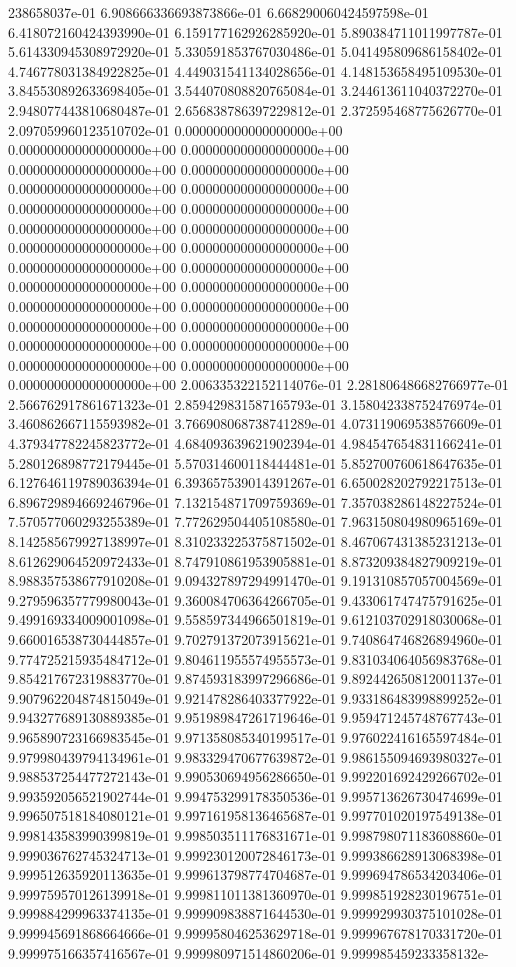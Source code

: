 238658037e-01	6.908666336693873866e-01	6.668290060424597598e-01	6.418072160424393990e-01	6.159177162926285920e-01	5.890384711011997787e-01	5.614330945308972920e-01	5.330591853767030486e-01	5.041495809686158402e-01	4.746778031384922825e-01	4.449031541134028656e-01	4.148153658495109530e-01	3.845530892633698405e-01	3.544070808820765084e-01	3.244613611040372270e-01	2.948077443810680487e-01	2.656838786397229812e-01	2.372595468775626770e-01	2.097059960123510702e-01	0.000000000000000000e+00	0.000000000000000000e+00	0.000000000000000000e+00	0.000000000000000000e+00	0.000000000000000000e+00	0.000000000000000000e+00	0.000000000000000000e+00	0.000000000000000000e+00	0.000000000000000000e+00	0.000000000000000000e+00	0.000000000000000000e+00	0.000000000000000000e+00	0.000000000000000000e+00	0.000000000000000000e+00	0.000000000000000000e+00	0.000000000000000000e+00	0.000000000000000000e+00	0.000000000000000000e+00	0.000000000000000000e+00	0.000000000000000000e+00	0.000000000000000000e+00	0.000000000000000000e+00	0.000000000000000000e+00	0.000000000000000000e+00	0.000000000000000000e+00	0.000000000000000000e+00	2.006335322152114076e-01	2.281806486682766977e-01	2.566762917861671323e-01	2.859429831587165793e-01	3.158042338752476974e-01	3.460862667115593982e-01	3.766908068738741289e-01	4.073119069538576609e-01	4.379347782245823772e-01	4.684093639621902394e-01	4.984547654831166241e-01	5.280126898772179445e-01	5.570314600118444481e-01	5.852700760618647635e-01	6.127646119789036394e-01	6.393657539014391267e-01	6.650028202792217513e-01	6.896729894669246796e-01	7.132154871709759369e-01	7.357038286148227524e-01	7.570577060293255389e-01	7.772629504405108580e-01	7.963150804980965169e-01	8.142585679927138997e-01	8.310233225375871502e-01	8.467067431385231213e-01	8.612629064520972433e-01	8.747910861953905881e-01	8.873209384827909219e-01	8.988357538677910208e-01	9.094327897294991470e-01	9.191310857057004569e-01	9.279596357779980043e-01	9.360084706364266705e-01	9.433061747475791625e-01	9.499169334009001098e-01	9.558597344966501819e-01	9.612103702918030068e-01	9.660016538730444857e-01	9.702791372073915621e-01	9.740864746826894960e-01	9.774725215935484712e-01	9.804611955574955573e-01	9.831034064056983768e-01	9.854217672319883770e-01	9.874593183997296686e-01	9.892442650812001137e-01	9.907962204874815049e-01	9.921478286403377922e-01	9.933186483998899252e-01	9.943277689130889385e-01	9.951989847261719646e-01	9.959471245748767743e-01	9.965890723166983545e-01	9.971358085340199517e-01	9.976022416165597484e-01	9.979980439794134961e-01	9.983329470677639872e-01	9.986155094693980327e-01	9.988537254477272143e-01	9.990530694956286650e-01	9.992201692429266702e-01	9.993592056521902744e-01	9.994753299178350536e-01	9.995713626730474699e-01	9.996507518184080121e-01	9.997161958136465687e-01	9.997701020197549138e-01	9.998143583990399819e-01	9.998503511176831671e-01	9.998798071183608860e-01	9.999036762745324713e-01	9.999230120072846173e-01	9.999386628913068398e-01	9.999512635920113635e-01	9.999613798774704687e-01	9.999694786534203406e-01	9.999759570126139918e-01	9.999811011381360970e-01	9.999851928230196751e-01	9.999884299963374135e-01	9.999909838871644530e-01	9.999929930375101028e-01	9.999945691868664666e-01	9.999958046253629718e-01	9.999967678170331720e-01	9.999975166357416567e-01	9.999980971514860206e-01	9.999985459233358132e-